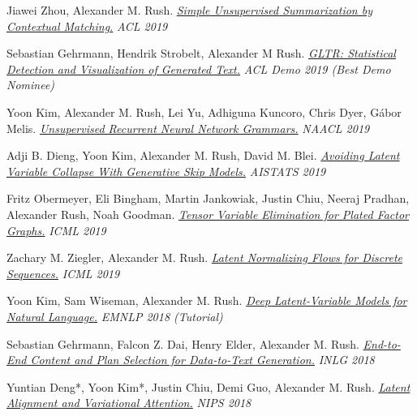 \documentclass[10pt]{article}
\begin{document}
\ind Jiawei Zhou, Alexander M. Rush. \emph{\href{ https://www.aclweb.org/anthology/P19-1503 }{ Simple Unsupervised Summarization by Contextual Matching.} }\emph{ ACL 2019 }

\medskip


\ind Sebastian Gehrmann, Hendrik Strobelt, Alexander M Rush. \emph{\href{ https://arxiv.org/abs/1906.04043 }{ GLTR: Statistical Detection and Visualization of Generated Text.} }\emph{ ACL Demo 2019 (Best Demo Nominee) }

\medskip


\ind Yoon Kim, Alexander M. Rush, Lei Yu, Adhiguna Kuncoro, Chris Dyer, Gábor Melis. \emph{\href{ https://arxiv.org/pdf/1904.03746.pdf }{ Unsupervised Recurrent Neural Network Grammars.} }\emph{ NAACL 2019 }

\medskip


\ind Adji B. Dieng, Yoon Kim, Alexander M. Rush, David M. Blei. \emph{\href{ https://arxiv.org/pdf/1807.04863.pdf }{ Avoiding Latent Variable Collapse With Generative Skip Models.} }\emph{ AISTATS 2019 }

\medskip


\ind Fritz Obermeyer, Eli Bingham, Martin Jankowiak, Justin Chiu, Neeraj Pradhan, Alexander Rush, Noah Goodman. \emph{\href{ https://arxiv.org/pdf/1902.03210.pdf }{ Tensor Variable Elimination for Plated Factor Graphs.} }\emph{ ICML 2019 }

\medskip


\ind Zachary M. Ziegler, Alexander M. Rush. \emph{\href{ https://arxiv.org/pdf/1901.10548 }{ Latent Normalizing Flows for Discrete Sequences.} }\emph{ ICML 2019 }

\medskip


\ind Yoon Kim, Sam Wiseman, Alexander M. Rush. \emph{\href{ https://github.com/harvardnlp/DeepLatentNLP/raw/master/tutorial_deep_latent.pdf }{ Deep Latent-Variable Models for Natural Language.} }\emph{ EMNLP 2018 (Tutorial) }

\medskip


\ind Sebastian Gehrmann, Falcon Z. Dai, Henry Elder, Alexander M. Rush. \emph{\href{ https://arxiv.org/pdf/1810.04700 }{ End-to-End Content and Plan Selection for Data-to-Text Generation.} }\emph{ INLG 2018 }

\medskip


\ind Yuntian Deng*, Yoon Kim*, Justin Chiu, Demi Guo, Alexander M. Rush. \emph{\href{ https://arxiv.org/pdf/1807.03756.pdf }{ Latent Alignment and Variational Attention.} }\emph{ NIPS 2018 }
\end{document}
